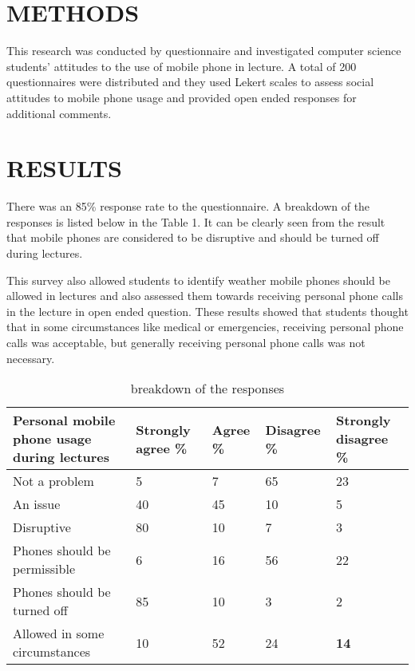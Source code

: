 \documentclass{article}
\begin{document}
\section{METHODS}\label{sec:into}
This research was conducted by questionnaire and investigated computer science students’ attitudes to the use of mobile phone in lecture. A total of 200 questionnaires were distributed and they used Lekert scales to assess social attitudes to mobile phone usage and provided open ended responses for additional comments.

\section{RESULTS}\label{sec:into}
There was an 85\% response rate to the questionnaire. A breakdown of the responses is listed below in the Table 1. It can be clearly seen from the result that mobile phones are considered to be disruptive and should be turned off during  lectures.

This survey also allowed students to identify weather mobile phones should be allowed in lectures and also assessed them towards receiving personal phone calls in the lecture in open ended question. These results showed that students thought that in some circumstances like medical or emergencies, receiving personal phone calls was acceptable, but generally receiving personal phone calls was not necessary.


\begin{table}[]
\centering
\caption{breakdown of the responses }
\label{my-label}
\begin{tabular}{|l|l|l|l|l|}
\hline
Personal mobile phone usage during lectures & Strongly agree    \% & Agree \% & Disagree \% & Strongly disagree \%     \\ \hline
Not a problem                               & 5                    & 7        & 65          & 23                       \\ \hline
An issue                                    & 40                   & 45       & 10          & 5                        \\ \hline
Disruptive                                  & 80                   & 10       & 7           & {\color[HTML]{FFFFFF} 3} \\ \hline
Phones should be permissible                & 6                    & 16       & 56          & 22                       \\ \hline
Phones should be turned off                 & 85                   & 10       & 3           & 2                        \\ \hline
Allowed in some circumstances               & 10                   & 52       & 24          & \textbf{14}              \\ \hline
\end{tabular}
\end{table}
\end{document}
